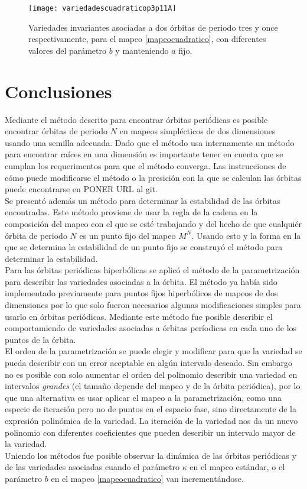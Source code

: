 \begin{figure}[H]
	\texttt{[image: variedadescuadraticop3p11A]}
	\caption{Variedades invariantes asociadas a dos \'orbitas de periodo tres y once respectivamente, para el mapeo \eqref{mapeocuadratico}, con diferentes valores del par\'ametro $b$ y manteniendo $a$ fijo.}
	\label{variedadescuadraticoper3per11vark}
\end{figure}
\section{Conclusiones}
Mediante el m\'etodo descrito para encontrar \'orbitas peri\'odicas es posible encontrar \'orbitas de periodo $N$ en mapeos simpl\'ecticos de dos dimensiones usando una semilla adecuada. Dado que el m\'etodo usa internamente un m\'etodo para encontrar ra\'ices en una dimensi\'on es importante tener en cuenta que se cumplan los requerimentos para que el m\'etodo converga. Las instrucciones de c\'omo puede modificarse el m\'etodo o la presici\'on con la que se calculan las \'orbitas puede encontrarse en PONER URL al git. \\

Se present\'o adem\'as un m\'etodo para determinar la estabilidad de las \'orbitas encontradas. Este m\'etodo proviene de usar la regla de la cadena en la composici\'on del mapeo con el que se est\'e trabajando y del hecho de que cualqui\'er \'orbita de periodo $N$ es un punto fijo del mapeo $M^{N}$. Usando esto y la forma en la que se determina la estabilidad de un punto fijo se construy\'o el m\'etodo para determinar la estabilidad.\\

Para las \'orbitas peri\'odicas hiperb\'olicas se aplic\'o el m\'etodo de la parametrizaci\'on para describir las variedades asociadas a la \'orbita. El m\'etodo ya hab\'ia sido implementado previamente para puntos fijos hiperb\'olicos de mapeos de dos dimensiones por lo que solo fueron necesarios algunas modificaciones simples para usarlo en \'orbitas peri\'odicas. Mediante este m\'etodo fue posible describir el comportamiendo de variedades asociadas a \'orbitas per\'iodicas en cada uno de los puntos de la \'orbita.\\

El orden de la parametrizaci\'on se puede elegir y modificar para que la variedad se pueda describir con un error aceptable en alg\'un intervalo deseado. Sin embargo no es posible con solo aumentar el orden del polinomio describir una variedad en intervalos \textit{grandes} (el tamaño depende del mapeo y de la \'orbita peri\'odica), por lo que una alternativa es usar aplicar el mapeo a la parametrizaci\'on, como una especie de iteraci\'on pero no de puntos en el espacio fase, sino directamente de la expresi\'on polin\'omica de la variedad. La iteraci\'on de la variedad nos da un nuevo polinomio con diferentes coeficientes que pueden describir un intervalo mayor de la variedad. \\

Uniendo los m\'etodos fue posible observar la din\'amica de las \'orbitas peri\'odicas y de las variedades asociadas cuando el par\'ametro $\kappa$ en el mapeo est\'andar, o el par\'ametro $b$ en el mapeo \eqref{mapeocuadratico} van increment\'andose. 






